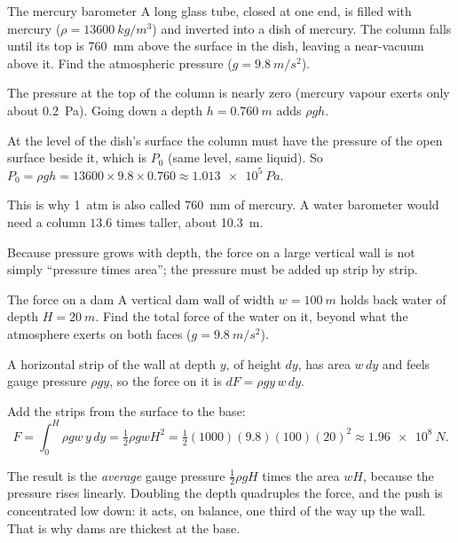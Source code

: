 \begin{exbox}{The mercury barometer}\label{ex:fluids-barometer}
A long glass tube, closed at one end, is filled with mercury ($\rho=\SI{13600}{kg/m^3}$) and inverted into
a dish of mercury. The column falls until its top is \SI{760}{mm} above the surface in the dish, leaving a
near-vacuum above it. Find the atmospheric pressure ($g=\SI{9.8}{m/s^2}$).

 The pressure at the top of the column is nearly zero (mercury vapour exerts only about
\SI{0.2}{Pa}). Going down a depth $h=\SI{0.760}{m}$ adds $\rho gh$.

 At the level of the dish's surface the column must have the pressure of the open surface beside
it, which is $P_0$ (same level, same liquid). So
$P_0=\rho gh=13600\times9.8\times0.760\approx\SI{1.013e5}{Pa}$.

\medskip
This is why \SI{1}{atm} is also called \SI{760}{mm} of mercury. A water barometer would need a column
$13.6$ times taller, about \SI{10.3}{m}. 
\end{exbox}

Because pressure grows with depth, the force on a large vertical wall is not simply ``pressure times area'';
the pressure must be added up strip by strip.

\begin{exbox}{The force on a dam}\label{ex:fluids-dam}
A vertical dam wall of width $w=\SI{100}{m}$ holds back water of depth $H=\SI{20}{m}$. Find the total force
of the water on it, beyond what the atmosphere exerts on both faces ($g=\SI{9.8}{m/s^2}$).

 A horizontal strip of the wall at depth $y$, of height $dy$, has area $w\,dy$ and feels gauge
pressure $\rho gy$, so the force on it is $dF=\rho gy\,w\,dy$.

 Add the strips from the surface to the base:
\[
F=\int_0^H\rho g w\,y\,dy=\tfrac12\rho gwH^2=\tfrac12(1000)(9.8)(100)(20)^2\approx\SI{1.96e8}{N}.
\]

 The result is the \emph{average} gauge pressure $\tfrac12\rho gH$ times the area $wH$, because the
pressure rises linearly. Doubling the depth quadruples the force, and the push is concentrated low down:
it acts, on balance, one third of the way up the wall. That is why dams are thickest at the base.
\end{exbox}

